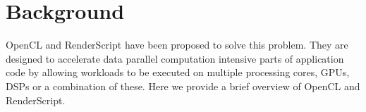 \section{Background}
\label{sec:background}

OpenCL and RenderScript have been proposed to solve this problem. They are
designed to accelerate data parallel computation intensive parts of application
code by allowing workloads to be executed on multiple processing cores, GPUs,
DSPs or a combination of these. Here we provide a brief overview of OpenCL and
RenderScript.



